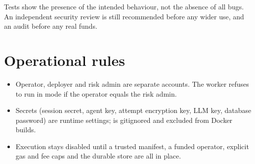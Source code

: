 \begin{caution}
Tests show the presence of the intended behaviour, not the absence of all bugs. An independent security review is still recommended before any wider use, and an audit before any real funds.
\end{caution}

\section{Operational rules}

\begin{itemize}
  \item Operator, deployer and risk admin are separate accounts. The worker refuses to run in  mode if the operator equals the risk admin.
  \item Secrets (session secret, agent key, attempt encryption key, LLM key, database password) are runtime settings;  is gitignored and excluded from Docker builds.
  \item Execution stays disabled until a trusted manifest, a funded operator, explicit gas and fee caps and the durable store are all in place.
\end{itemize}
